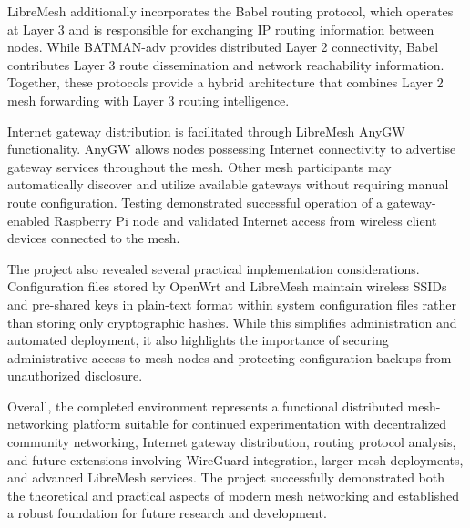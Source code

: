 \documentclass[conference]{IEEEtran}
\begin{document}
LibreMesh additionally incorporates the Babel routing protocol, which operates at Layer 3 and is responsible for exchanging IP routing information between nodes. While BATMAN-adv provides distributed Layer 2 connectivity, Babel contributes Layer 3 route dissemination and network reachability information. Together, these protocols provide a hybrid architecture that combines Layer 2 mesh forwarding with Layer 3 routing intelligence.

Internet gateway distribution is facilitated through LibreMesh AnyGW functionality. AnyGW allows nodes possessing Internet connectivity to advertise gateway services throughout the mesh. Other mesh participants may automatically discover and utilize available gateways without requiring manual route configuration. Testing demonstrated successful operation of a gateway-enabled Raspberry Pi node and validated Internet access from wireless client devices connected to the mesh.

The project also revealed several practical implementation considerations. Configuration files stored by OpenWrt and LibreMesh maintain wireless SSIDs and pre-shared keys in plain-text format within system configuration files rather than storing only cryptographic hashes. While this simplifies administration and automated deployment, it also highlights the importance of securing administrative access to mesh nodes and protecting configuration backups from unauthorized disclosure.

Overall, the completed environment represents a functional distributed mesh-networking platform suitable for continued experimentation with decentralized community networking, Internet gateway distribution, routing protocol analysis, and future extensions involving WireGuard integration, larger mesh deployments, and advanced LibreMesh services. The project successfully demonstrated both the theoretical and practical aspects of modern mesh networking and established a robust foundation for future research and development.



\end{document}
